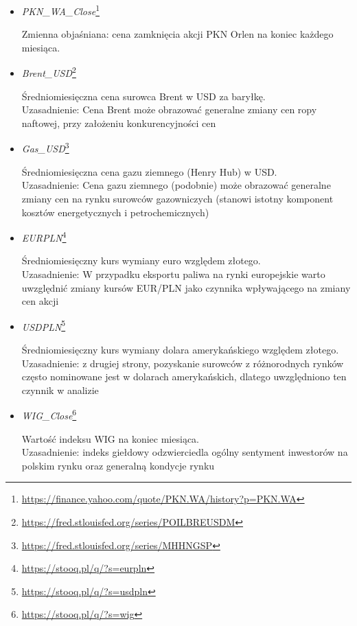 \documentclass[12pt, twoside]{article}
\begin{document}
\begin{itemize}
  \item \textit{PKN\_WA\_Close}\footnote{\url{https://finance.yahoo.com/quote/PKN.WA/history?p=PKN.WA}}  
     
     Zmienna objaśniana: cena zamknięcia akcji PKN Orlen na koniec każdego miesiąca.  
     

  \item \textit{Brent\_USD}\footnote{\url{https://fred.stlouisfed.org/series/POILBREUSDM}}  

     Średniomiesięczna cena surowca Brent w USD za baryłkę.  
     \\
     Uzasadnienie: Cena Brent może obrazować generalne zmiany cen ropy naftowej, przy założeniu konkurencyjności cen

  \newpage   
  \item \textit{Gas\_USD}\footnote{\url{https://fred.stlouisfed.org/series/MHHNGSP}}  

     Średniomiesięczna cena gazu ziemnego (Henry Hub) w USD.  
     \\
     Uzasadnienie: Cena gazu ziemnego (podobnie) może obrazować generalne zmiany cen na rynku surowców gazowniczych (stanowi istotny komponent kosztów energetycznych i petrochemicznych)

  \item \textit{EURPLN}\footnote{\url{https://stooq.pl/q/?s=eurpln}}  

     Średniomiesięczny kurs wymiany euro względem złotego.  
     \\
     Uzasadnienie: W przypadku eksportu paliwa na rynki europejskie warto uwzględnić zmiany kursów EUR/PLN jako czynnika wpływającego na zmiany cen akcji
     
  \item \textit{USDPLN}\footnote{\url{https://stooq.pl/q/?s=usdpln}}  

     Średniomiesięczny kurs wymiany dolara amerykańskiego względem złotego.  
     \\
     Uzasadnienie: z drugiej strony, pozyskanie surowców z różnorodnych rynków często nominowane jest w dolarach amerykańskich, dlatego uwzględniono ten czynnik w analizie
     

  \item \textit{WIG\_Close}\footnote{\url{https://stooq.pl/q/?s=wig}}  

     Wartość indeksu WIG na koniec miesiąca.  
     \\
     Uzasadnienie: indeks giełdowy odzwierciedla ogólny sentyment inwestorów na polskim rynku oraz generalną kondycje rynku 


\end{itemize}
\end{document}

